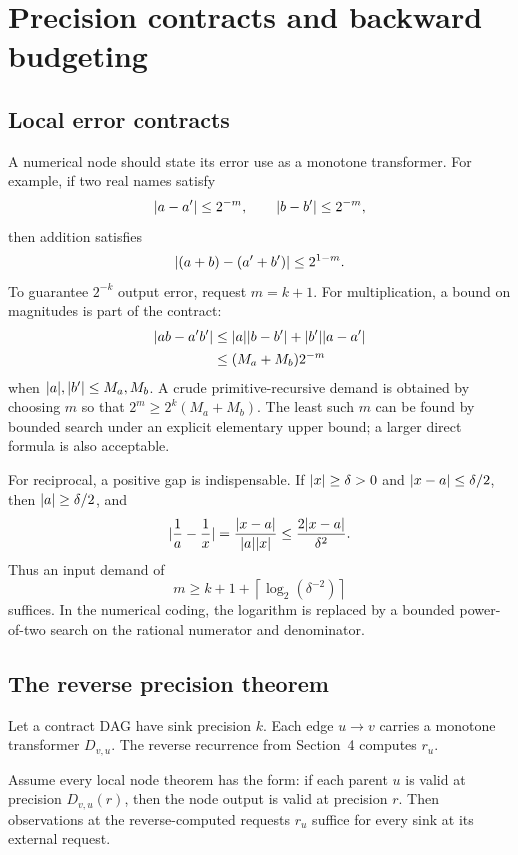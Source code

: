 \section{Precision contracts and backward budgeting}

\subsection{Local error contracts}

A numerical node should state its error use as a monotone transformer.
For example, if two real names satisfy
\[
 \lvert a-a'\rvert\le 2^{-m},\qquad
 \lvert b-b'\rvert\le 2^{-m},
\]
then addition satisfies
\[
 \lvert (a+b)-(a'+b')\rvert\le 2^{1-m}.
\]
To guarantee \(2^{-k}\) output error, request \(m=k+1\).  For multiplication,
a bound on magnitudes is part of the contract:
\[
\begin{aligned}
 \lvert ab-a'b'\rvert
 &\le \lvert a\rvert\lvert b-b'\rvert+\lvert b'\rvert\lvert a-a'\rvert\\
 &\le (M_a+M_b)2^{-m}
\end{aligned}
\]
when \(\lvert a\rvert,\lvert b'\rvert\le M_a,M_b\).  A crude primitive-recursive demand is
obtained by choosing \(m\) so that
\(2^m\ge 2^k(M_a+M_b)\).  The least such \(m\) can be found by bounded search
under an explicit elementary upper bound; a larger direct formula is also
acceptable.

For reciprocal, a positive gap is indispensable.  If
\(\lvert x\rvert\ge\delta>0\) and
\(\lvert x-a\rvert\le\delta/2\), then \(\lvert a\rvert\ge\delta/2\), and
\[
  \lvert \frac1a-\frac1x\rvert
   =\frac{\lvert x-a\rvert}{\lvert a\rvert\lvert x\rvert}
   \le \frac{2\lvert x-a\rvert}{\delta^2}.
\]
Thus an input demand of
\[
  m\ge k+1+\left\lceil\log_2(\delta^{-2})\right\rceil
\]
suffices.  In the numerical coding, the logarithm is replaced by a bounded
power-of-two search on the rational numerator and denominator.

\subsection{The reverse precision theorem}

Let a contract DAG have sink precision \(k\).  Each edge \(u\to v\) carries
a monotone transformer \(D_{v,u}\).  The reverse recurrence from
Section~4 computes \(r_u\).

\begin{theorem}
Assume every local node theorem has the form:
if each parent \(u\) is valid at precision \(D_{v,u}(r)\), then the node output
is valid at precision \(r\).  Then observations at the reverse-computed
requests \(r_u\) suffice for every sink at its external request.
\end{theorem}

